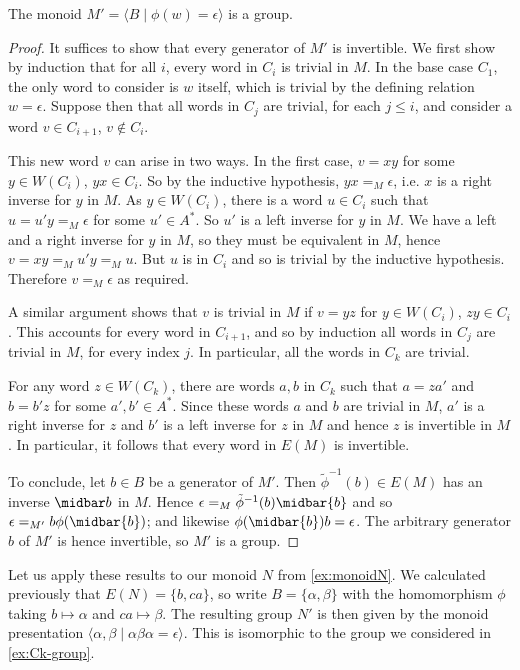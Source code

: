 \documentclass[showlabels,noindex,12pt]{lmaths}
\begin{document}
\begin{prop} \label{prop:M'-is-group}
	The monoid $M' = \langle B \mid \phi(w) = \epsilon\rangle$ is a group.
\end{prop}
\begin{proof}
	It suffices to show that every generator of $M'$ is invertible. We first show by induction that for all $i$, every word in $C_i$ is trivial in $M$. In the base case $C_1$, the only word to consider is $w$ itself, which is trivial by the defining relation $w = \epsilon$. Suppose then that all words in $C_j$ are trivial, for each $j \le i$, and consider a word $v \in C_{i+1}$, $v \not\in C_i$.

	This new word $v$ can arise in two ways. In the first case, $v = xy$ for some $y \in W(C_i)$, $yx \in C_i$. So by the inductive hypothesis, $yx =_M \epsilon$, i.e. $x$ is a right inverse for $y$ in $M$. As $y \in W(C_i)$, there is a word $u \in C_i$ such that $u = u'y =_M \epsilon$ for some $u' \in A^*$. So $u'$ is a left inverse for $y$ in $M$. We have a left and a right inverse for $y$ in $M$, so they must be equivalent in $M$, hence $v = xy =_M u'y =_M u$. But $u$ is in $C_i$ and so is trivial by the inductive hypothesis. Therefore $v =_M \epsilon$ as required.

	A similar argument shows that $v$ is trivial in $M$ if $v = yz$ for $y \in W(C_i)$, $zy \in C_i$. This accounts for every word in $C_{i+1}$, and so by induction all words in $C_j$ are trivial in $M$, for every index $j$. In particular, all the words in $C_k$ are trivial.

	For any word $z \in W(C_k)$, there are words $a, b$ in $C_k$ such that $a = za'$ and $b = b'z$ for some $a', b' \in A^*$. Since these words $a$ and $b$ are trivial in $M$, $a'$ is a right inverse for $z$ and $b'$ is a left inverse for $z$ in $M$ and hence $z$ is invertible in $M$. In particular, it follows that every word in $E(M)$ is invertible.

	To conclude, let $b \in B$ be a generator of $M'$. Then $\tilde\phi^{-1}(b) \in E(M)$ has an inverse $\midbar b$ in $M$. Hence $\epsilon =_M \tilde\phi^{-1}(b) \midbar{b}$ and so $\epsilon =_{M'} b\phi(\midbar{b})$; and likewise $\phi(\midbar{b})b = \epsilon$. The arbitrary generator $b$ of $M'$ is hence invertible, so $M'$ is a group.
\end{proof}

Let us apply these results to our monoid $N$ from \cref{ex:monoidN}. We calculated previously that $E(N) = \{b, ca\}$, so write $B = \{\alpha, \beta\}$ with the homomorphism $\phi$ taking $b \mapsto \alpha$ and $ca \mapsto \beta$. The resulting group $N'$ is then given by the monoid presentation $\langle \alpha, \beta \mid \alpha\beta\alpha = \epsilon \rangle$. This is isomorphic to the group we considered in \cref{ex:Ck-group}.
\end{document}
